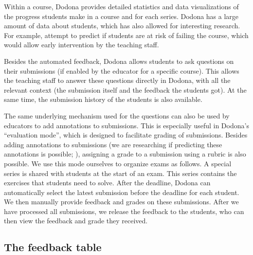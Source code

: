\documentclass[../main]{subfiles}
\begin{document}
Within a course, Dodona provides detailed statistics and data visualizations of the progress students make in a course and for each series.
Dodona has a large amount of data about students, which has also allowed for interesting research.
For example, \textcite{vanpetegemPassFailPrediction2023} attempt to predict if students are at risk of failing the course, which would allow early intervention by the teaching staff.

Besides the automated feedback, Dodona allows students to ask questions on their submissions (if enabled by the educator for a specific course).
This allows the teaching staff to answer these questions directly in Dodona, with all the relevant context (the submission itself and the feedback the students got).
At the same time, the submission history of the students is also available.

The same underlying mechanism used for the questions can also be used by educators to add annotations to submissions.
This is especially useful in Dodona's ``evaluation mode'', which is designed to facilitate grading of submissions.
Besides adding annotations to submissions (we are researching if predicting these annotations is possible; \cite{vanpetegemMiningPatternsSyntax2024}), assigning a grade to a submission using a rubric is also possible.
We use this mode ourselves to organize exams as follows.
A special series is shared with students at the start of an exam.
This series contains the exercises that students need to solve.
After the deadline, Dodona can automatically select the latest submission before the deadline for each student.
We then manually provide feedback and grades on these submissions.
After we have processed all submissions, we release the feedback to the students, who can then view the feedback and grade they received.

\subsection{The feedback table}\label{subsec:the-feedback-table}
\end{document}

